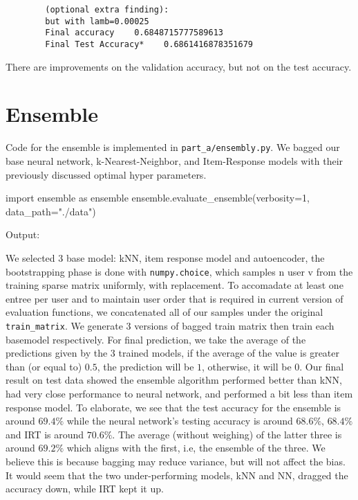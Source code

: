 \documentclass{article}
\begin{document}
    \begin{verbatim}
        (optional extra finding):
        but with lamb=0.00025
        Final accuracy    0.6848715777589613
        Final Test Accuracy*    0.6861416878351679
    \end{verbatim}

    There are improvements on the validation accuracy, but not on the test accuracy.


    \pagebreak

    \section{Ensemble}
    Code for the ensemble is implemented in \verb|part_a/ensembly.py|. We bagged our base neural network, k-Nearest-Neighbor, and Item-Response models with their previously discussed optimal hyper parameters.

    \begin{pylabblock}[ENSEMBLE]
        import ensemble as ensemble
        ensemble.evaluate_ensemble(verbosity=1, data_path="./data")
    \end{pylabblock}

    \medskip

    Output:

    \printpythontex[verb]

    \medskip

    We selected 3 base model: kNN, item response model and autoencoder, the bootstrapping phase is done with \verb|numpy.choice|, which samples n user v from the training sparse matrix uniformly, with replacement. To accomadate at least one entree per user and to maintain user order that is required in current version of evaluation functions, we concatenated all of our samples under the original \verb|train_matrix|. We generate 3 versions of bagged train matrix then train each basemodel respectively. For final prediction, we take the average of the predictions given by the 3 trained models, if the average of the value is greater than (or equal to) $0.5$, the prediction will be $1$, otherwise, it will be $0$. Our final result on test data showed the ensemble algorithm performed better than kNN, had very close performance to neural network, and performed a bit less than item response model. To elaborate, we see that the test accuracy for the ensemble is around $69.4\%$ while the neural network's testing accuracy is around $68.6\%$, $68.4\%$ and IRT is around $70.6\%$. The average (without weighing) of the latter three is around $69.2\%$ which aligns with the first, i.e, the ensemble of the three. We believe this is because bagging may reduce variance, but will not affect the bias. It would seem that the two under-performing models, kNN and NN, dragged the accuracy down, while IRT kept it up.
\end{document}
